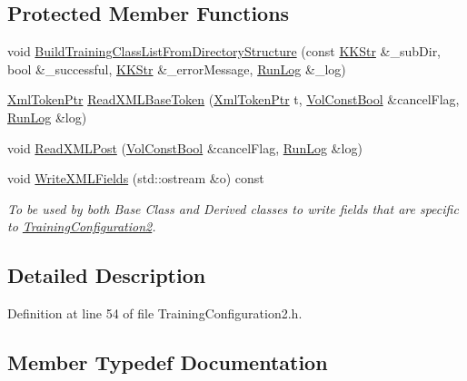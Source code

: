 \subsection*{Protected Member Functions}
\begin{DoxyCompactItemize}
\item 
void \hyperlink{class_k_k_m_l_l_1_1_training_configuration2_a05bd9d6aa3ad45fc35a826185f88cba4}{Build\+Training\+Class\+List\+From\+Directory\+Structure} (const \hyperlink{class_k_k_b_1_1_k_k_str}{K\+K\+Str} \&\+\_\+sub\+Dir, bool \&\+\_\+successful, \hyperlink{class_k_k_b_1_1_k_k_str}{K\+K\+Str} \&\+\_\+error\+Message, \hyperlink{class_k_k_b_1_1_run_log}{Run\+Log} \&\+\_\+log)
\item 
\hyperlink{namespace_k_k_b_af349a060847626df6b468fe15d373972}{Xml\+Token\+Ptr} \hyperlink{class_k_k_m_l_l_1_1_training_configuration2_a4e59170ce298651638a3be00b185bbe7}{Read\+X\+M\+L\+Base\+Token} (\hyperlink{namespace_k_k_b_af349a060847626df6b468fe15d373972}{Xml\+Token\+Ptr} t, \hyperlink{namespace_k_k_b_a7d390f568e2831fb76b86b56c87bf92f}{Vol\+Const\+Bool} \&cancel\+Flag, \hyperlink{class_k_k_b_1_1_run_log}{Run\+Log} \&log)
\item 
void \hyperlink{class_k_k_m_l_l_1_1_training_configuration2_a3aa284a198e844fcac046968d3206409}{Read\+X\+M\+L\+Post} (\hyperlink{namespace_k_k_b_a7d390f568e2831fb76b86b56c87bf92f}{Vol\+Const\+Bool} \&cancel\+Flag, \hyperlink{class_k_k_b_1_1_run_log}{Run\+Log} \&log)
\item 
void \hyperlink{class_k_k_m_l_l_1_1_training_configuration2_a939f489d0a51f6f527b1f28820dc4ecc}{Write\+X\+M\+L\+Fields} (std\+::ostream \&o) const 
\begin{DoxyCompactList}\small\item\em To be used by both Base Class and Derived classes to write fields that are specific to \textquotesingle{}\hyperlink{class_k_k_m_l_l_1_1_training_configuration2}{Training\+Configuration2}\textquotesingle{}. \end{DoxyCompactList}\end{DoxyCompactItemize}


\subsection{Detailed Description}


Definition at line 54 of file Training\+Configuration2.\+h.



\subsection{Member Typedef Documentation}
